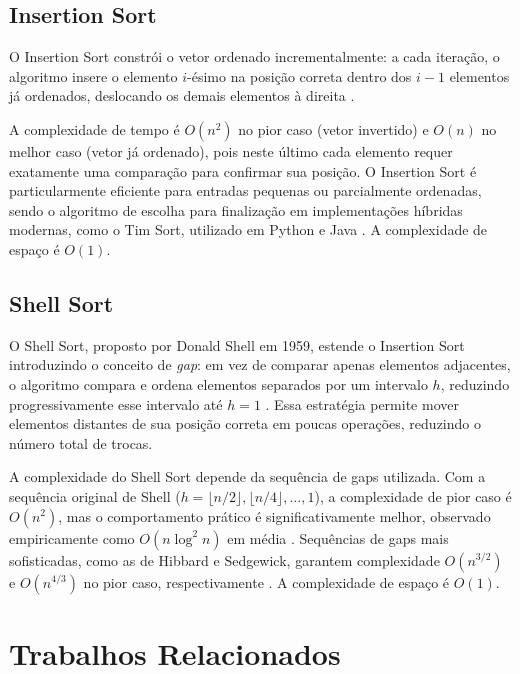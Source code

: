\documentclass[12pt]{article}
\begin{document}
\subsection{Insertion Sort}

O Insertion Sort constrói o vetor ordenado incrementalmente:
a cada iteração, o algoritmo insere o elemento $i$-ésimo na
posição correta dentro dos $i-1$ elementos já ordenados,
deslocando os demais elementos à direita \cite{cormen2009}.

A complexidade de tempo é $O(n^2)$ no pior caso (vetor invertido)
e $O(n)$ no melhor caso (vetor já ordenado), pois neste último
cada elemento requer exatamente uma comparação para confirmar
sua posição. O Insertion Sort é particularmente eficiente para
entradas pequenas ou parcialmente ordenadas, sendo o algoritmo
de escolha para finalização em implementações híbridas modernas,
como o Tim Sort, utilizado em Python e Java \cite{cormen2009}.
A complexidade de espaço é $O(1)$.

\subsection{Shell Sort}

O Shell Sort, proposto por Donald Shell em 1959, estende o
Insertion Sort introduzindo o conceito de \textit{gap}: em vez
de comparar apenas elementos adjacentes, o algoritmo compara e
ordena elementos separados por um intervalo $h$, reduzindo
progressivamente esse intervalo até $h = 1$ \cite{shell1959}.
Essa estratégia permite mover elementos distantes de sua posição
correta em poucas operações, reduzindo o número total de trocas.

A complexidade do Shell Sort depende da sequência de gaps
utilizada. Com a sequência original de Shell ($h = \lfloor n/2
\rfloor, \lfloor n/4 \rfloor, \ldots, 1$), a complexidade de
pior caso é $O(n^2)$, mas o comportamento prático é
significativamente melhor, observado empiricamente como
$O(n \log^2 n)$ em média \cite{knuth1998}. Sequências de gaps
mais sofisticadas, como as de Hibbard e Sedgewick, garantem
complexidade $O(n^{3/2})$ e $O(n^{4/3})$ no pior caso,
respectivamente \cite{sedgewick1996}. A complexidade de espaço
é $O(1)$.

\section{Trabalhos Relacionados}
\label{sec:related}
\end{document}
